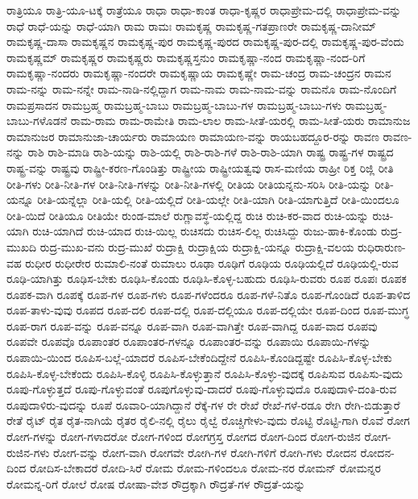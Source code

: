 {ರಾತ್ರಿಯೂ
ರಾತ್ರಿ-ಯೂ-ಟಕ್ಕೆ
ರಾತ್ರೆಯೂ
ರಾಧಾ
ರಾಧಾ-ಕಾಂತ
ರಾಧಾ-ಕೃಷ್ಣರ
ರಾಧಾಪ್ರೇಮ-ದಲ್ಲಿ
ರಾಧಾಪ್ರೇಮ-ವನ್ನು
ರಾಧೆ
ರಾಧೆ-ಯನ್ನು
ರಾಧೆ-ಯಾಗಿ
ರಾಮ
ರಾಮಃ
ರಾಮಕೃಷ್ಣ
ರಾಮಕೃಷ್ಣ-ಗತಪ್ರಾಣರೇ
ರಾಮಕೃಷ್ಣ-ದಾನೀಮ್
ರಾಮಕೃಷ್ಣ-ದಾಸಾ
ರಾಮಕೃಷ್ಣನ
ರಾಮಕೃಷ್ಣ-ಪುರ
ರಾಮಕೃಷ್ಣ-ಪುರದ
ರಾಮಕೃಷ್ಣ-ಪುರ-ದಲ್ಲಿ
ರಾಮಕೃಷ್ಣ-ಪುರ-ವೆಂದು
ರಾಮಕೃಷ್ಣಮ್
ರಾಮಕೃಷ್ಣರ
ರಾಮಕೃಷ್ಣರು
ರಾಮಕೃಷ್ಣಸ್ತನುಂ
ರಾಮಕೃಷ್ಣಾ-ನಂದ
ರಾಮಕೃಷ್ಣಾ-ನಂದ-ರಿಗೆ
ರಾಮಕೃಷ್ಣಾ-ನಂದರು
ರಾಮಕೃಷ್ಣಾ-ನಂದರೇ
ರಾಮಕೃಷ್ಣಾಯ
ರಾಮಕೃಷ್ಣೇ
ರಾಮ-ಚಂದ್ರ
ರಾಮ-ಚಂದ್ರನ
ರಾಮನ
ರಾಮ-ನನ್ನು
ರಾಮ-ನನ್ನೇ
ರಾಮ-ನಾಡಿ-ನಲ್ಲಿದ್ದಾಗ
ರಾಮ-ನಾಮ
ರಾಮ-ನಾಮ-ವನ್ನು
ರಾಮನೊ
ರಾಮ-ನೊಂದಿಗೆ
ರಾಮಪ್ರಸಾದನ
ರಾಮಬ್ರಹ್ಮ
ರಾಮಬ್ರಹ್ಮ-ಬಾಬು
ರಾಮಬ್ರಹ್ಮ-ಬಾಬು-ಗಳ
ರಾಮಬ್ರಹ್ಮ-ಬಾಬು-ಗಳು
ರಾಮಬ್ರಹ್ಮ-ಬಾಬು-ಗಳೊಡನೆ
ರಾಮ-ರಾಮ
ರಾಮ-ರಾಮೇತಿ
ರಾಮ-ಲಾಲ
ರಾಮ-ಸೀತೆ-ಯರಲ್ಲಿ
ರಾಮ-ಸೀತೆ-ಯರು
ರಾಮಾನುಜ
ರಾಮಾನುಜರ
ರಾಮಾನುಜಾ-ಚಾರ್ಯರು
ರಾಮಾಯಣ
ರಾಮಾಯಣ-ವನ್ನು
ರಾಯಬಹದ್ದೂರ-ರನ್ನು
ರಾವಣ
ರಾವಣ-ನನ್ನು
ರಾಶಿ
ರಾಶಿ-ಮಾಡಿ
ರಾಶಿ-ಯನ್ನು
ರಾಶಿ-ಯಲ್ಲಿ
ರಾಶಿ-ರಾಶಿ-ಗಳೆ
ರಾಶಿ-ರಾಶಿ-ಯಾಗಿ
ರಾಷ್ಟ್ರ
ರಾಷ್ಟ್ರ-ಗಳ
ರಾಷ್ಟ್ರದ
ರಾಷ್ಟ್ರ-ವನ್ನು
ರಾಷ್ಟ್ರವು
ರಾಷ್ಟ್ರೀ-ಕರಣ-ಗೊಂಡಿತ್ತು
ರಾಷ್ಟ್ರೀಯ
ರಾಷ್ಟ್ರೀಯತ್ವವು
ರಾಸ-ಮಣಿಯ
ರಾಹ್ರೀ
ರಿಕ್ತ
ರಿಜ್ಲಿ
ರೀತಿ
ರೀತಿ-ಗಳು
ರೀತಿ-ನೀತಿ-ಗಳ
ರೀತಿ-ನೀತಿ-ಗಳನ್ನು
ರೀತಿ-ನೀತಿ-ಗಳಲ್ಲಿ
ರೀತಿಯ
ರೀತಿಯನ್ನನು-ಸರಿಸಿ
ರೀತಿ-ಯನ್ನು
ರೀತಿ-ಯನ್ನೂ
ರೀತಿ-ಯನ್ನೆಲ್ಲಾ
ರೀತಿ-ಯಲ್ಲಿ
ರೀತಿ-ಯಲ್ಲಿದೆ
ರೀತಿ-ಯಲ್ಲೇ
ರೀತಿ-ಯಾಗಿ
ರೀತಿ-ಯಾಗುತ್ತಿದೆ
ರೀತಿ-ಯಿಂದಲೂ
ರೀತಿ-ಯಿದೆ
ರೀತಿಯೂ
ರೀತಿಯೇ
ರುಂಡ-ಮಾಲೆ
ರುಗ್ಣಾವಸ್ಥೆ-ಯಲ್ಲಿದ್ದ
ರುಚಿ
ರುಚಿ-ಕರ-ವಾದ
ರುಚಿ-ಯನ್ನು
ರುಚಿ-ಯಾಗಿ
ರುಚಿ-ಯಾಗಿದೆ
ರುಚಿ-ಯಾದ
ರುಚಿ-ಯಿಲ್ಲ
ರುಚಿಸದು
ರುಚಿಸ-ಲಿಲ್ಲ
ರುಚಿಸಿದ್ದು
ರುಜು-ಹಾಕಿ-ಕೊಂಡು
ರುದ್ರ-ಮುಖದಿ
ರುದ್ರ-ಮುಖ-ವನು
ರುದ್ರ-ಮುಖೆ
ರುದ್ರಾಕ್ಷಿ
ರುದ್ರಾಕ್ಷಿಯ
ರುದ್ರಾಕ್ಷಿ-ಯನ್ನೂ
ರುದ್ರಾಕ್ಷಿ-ವಲಯ
ರುಧಿರಾರುಣ-ವಹ
ರುಧೀರ
ರುಧೀರೇರ
ರುಮಾಲಿ-ನಂತೆ
ರುಮಾಲು
ರೂಢಾ
ರೂಢಿಗೆ
ರೂಢಿಯ
ರೂಢಿಯಲ್ಲಿದೆ
ರೂಢಿಯಲ್ಲಿ-ರುವ
ರೂಢಿ-ಯಾಗಿತ್ತು
ರೂಢಿಸ-ಬೇಕು
ರೂಢಿಸಿ-ಕೊಂಡು
ರೂಢಿಸಿ-ಕೊಳ್ಳ-ಬಹುದು
ರೂಢಿಸಿ-ರುವರು
ರೂಪ
ರೂಪಃ
ರೂಪಕ
ರೂಪಕ-ವಾಗಿ
ರೂಪಕ್ಕೆ
ರೂಪ-ಗಳ
ರೂಪ-ಗಳು
ರೂಪ-ಗಳೆಂದರೂ
ರೂಪ-ಗಳೆ-ನಿತೊ
ರೂಪ-ಗೊಂಡಿದೆ
ರೂಪ-ತಾಳಿದ
ರೂಪ-ತಾಳು-ವುವು
ರೂಪದ
ರೂಪ-ದಲಿ
ರೂಪ-ದಲ್ಲಿ
ರೂಪ-ದಲ್ಲಿಯೂ
ರೂಪ-ದಲ್ಲಿಯೇ
ರೂಪ-ದಿಂದ
ರೂಪ-ಮುಗ್ಧ
ರೂಪ-ರಾಗ
ರೂಪ-ವನ್ನು
ರೂಪ-ವನ್ನೂ
ರೂಪ-ವಾಗಿ
ರೂಪ-ವಾಗಿತ್ತೇ
ರೂಪ-ವಾಗಿದ್ದ
ರೂಪ-ವಾದ
ರೂಪವು
ರೂಪವೇ
ರೂಪವೊ
ರೂಪಾಂತರ
ರೂಪಾಂತರ-ಗಳನ್ನೂ
ರೂಪಾಂತರ-ವನ್ನು
ರೂಪಾಯಿ
ರೂಪಾಯಿ-ಗಳನ್ನು
ರೂಪಾಯಿ-ಯಿಂದ
ರೂಪಿಸ-ಬಲ್ಲೆ-ಯಾದರೆ
ರೂಪಿಸ-ಬೇಕೆಂದಿದ್ದೇನೆ
ರೂಪಿಸಿ-ಕೊಂಡಿದ್ದಷ್ಟೇ
ರೂಪಿಸಿ-ಕೊಳ್ಳ-ಬೇಕು
ರೂಪಿಸಿ-ಕೊಳ್ಳ-ಬೇಕೆಂದು
ರೂಪಿಸಿ-ಕೊಳ್ಳಿ
ರೂಪಿಸಿ-ಕೊಳ್ಳುತ್ತಾನೆ
ರೂಪಿಸಿ-ಕೊಳ್ಳು-ವುದಕ್ಕೆ
ರೂಪಿಸುವ
ರೂಪಿಸು-ವುದು
ರೂಪು-ಗೊಳ್ಳುತ್ತದೆ
ರೂಪು-ಗೊಳ್ಳುವಂತೆ
ರೂಪುಗೊಳ್ಳುವು-ದಾದರೆ
ರೂಪು-ಗೊಳ್ಳುವುದೊ
ರೂಪುದಾಳಿ-ದಂತಿ-ರುವ
ರೂಪುದಾಳಿರು-ವುದನ್ನು
ರೂಪೆ
ರೂವಾರಿ-ಯಾಗಿದ್ದಾನೆ
ರೆಕ್ಕೆ-ಗಳ
ರೇ
ರೇಖೆ
ರೇಖೆ-ಗಳೆ-ರಡೂ
ರೇಗಿ
ರೇಗಿ-ಬಿಡುತ್ತಾರೆ
ರೇತೆ
ರೈಟ್
ರೈತ
ರೈತ-ನಾಗಿಯೆ
ರೈತರ
ರೈಲಿ-ನಲ್ಲಿ
ರೈಲು
ರೈಲ್ವೆ
ರೊಚ್ಚಿಗೇಳು-ವುದು
ರೊಟ್ಟಿ
ರೊಟ್ಟಿ-ಗಾಗಿ
ರೊವೆ
ರೋಗ
ರೋಗ-ಗಳನ್ನು
ರೋಗ-ಗಳಾದರೋ
ರೋಗ-ಗಳಿಂದ
ರೋಗಗ್ರಸ್ತ
ರೋಗದ
ರೋಗ-ದಿಂದ
ರೋಗ-ರುಜಿನ
ರೋಗ-ರುಜಿನ-ಗಳು
ರೋಗ-ವನ್ನು
ರೋಗ-ವಾಗಿ
ರೋಗವೇ
ರೋಗಿ-ಗಳ
ರೋಗಿ-ಗಳಿಗೆ
ರೋಗಿ-ಗಳು
ರೋದನ
ರೋದನ-ದಿಂದ
ರೋದಿಸ-ಬೇಕಾದರೆ
ರೋದಿ-ಸಿರೆ
ರೋಮ
ರೋಮ-ಗಳಿಂದಲೂ
ರೋಮ-ನರ
ರೋಮನ್
ರೋಮನ್ನರ
ರೋಮನ್ನ-ರಿಗೆ
ರೋಲೆ
ರೋಷ
ರೋಷಾ-ವೇಶ
ರೌದ್ರಕ್ಕಾಗಿ
ರೌದ್ರತೆ-ಗಳ
ರೌದ್ರತೆ-ಯನ್ನು
}
